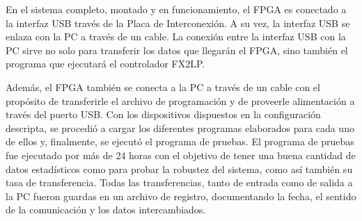 
En el sistema completo, montado y en funcionamiento, el FPGA es conectado a la interfaz USB través de la Placa de Interconexión. A su vez, la interfaz USB se enlaza con la PC a través de un cable. La conexión entre la interfaz USB con la PC sirve no solo para transferir los datos que llegarán el FPGA, sino también el programa que ejecutará el controlador FX2LP.

Además, el FPGA también se conecta a la PC a través de un cable con el propósito de transferirle el archivo de programación y de proveerle alimentación a través del puerto USB.
Con los dispositivos dispuestos en la configuración descripta, se procedió a cargar los diferentes programas elaborados para cada uno de ellos y, finalmente, se ejecutó el programa de pruebas.
El programa de pruebas fue ejecutado por más de 24 horas con el objetivo de tener una buena cantidad de datos estadísticos como para probar la robustez del sistema, como así también su tasa de transferencia.
Todas las transferencias, tanto de entrada como de salida a la PC fueron guardas en un archivo de registro, documentando la fecha, el sentido de la comunicación y los datos intercambiados. 